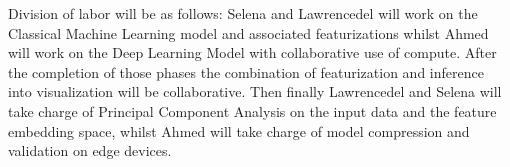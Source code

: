 \documentclass[sigconf,nonacm]{acmart}
\begin{document}
Division of labor will be as follows: Selena and Lawrencedel will work on the Classical Machine Learning model and associated featurizations whilst Ahmed will work on the Deep Learning Model with collaborative use of compute. After the completion of those phases the combination of featurization and inference into visualization will be collaborative. Then finally Lawrencedel and Selena will take charge of Principal Component Analysis on the input data and the feature embedding space, whilst Ahmed will take charge of model compression and validation on edge devices.




\end{document}
